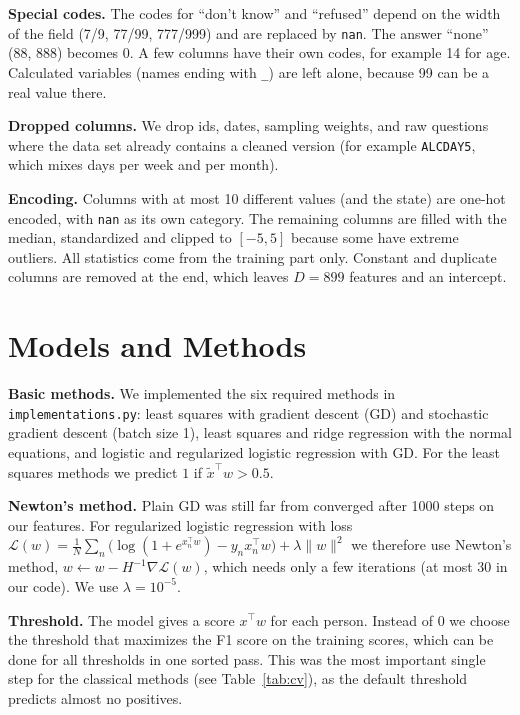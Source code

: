 \documentclass[10pt,conference,compsocconf]{IEEEtran}
\begin{document}
\textbf{Special codes.} The codes for ``don't know'' and ``refused'' depend on the width of the field (7/9, 77/99, 777/999) and are replaced by \texttt{nan}. The answer ``none'' (88, 888) becomes 0. A few columns have their own codes, for example 14 for age. Calculated variables (names ending with \texttt{\_}) are left alone, because 99 can be a real value there.

\textbf{Dropped columns.} We drop ids, dates, sampling weights, and raw questions where the data set already contains a cleaned version (for example \texttt{ALCDAY5}, which mixes days per week and per month).

\textbf{Encoding.} Columns with at most 10 different values (and the state) are one-hot encoded, with \texttt{nan} as its own category. The remaining columns are filled with the median, standardized and clipped to $[-5, 5]$ because some have extreme outliers. All statistics come from the training part only. Constant and duplicate columns are removed at the end, which leaves $D = 899$ features and an intercept.

\section{Models and Methods}
\label{sec:methods}

\textbf{Basic methods.} We implemented the six required methods in \texttt{implementations.py}: least squares with gradient descent (GD) and stochastic gradient descent (batch size 1), least squares and ridge regression with the normal equations, and logistic and regularized logistic regression with GD. For the least squares methods we predict $1$ if $\tilde{x}^\top w > 0.5$.

\textbf{Newton's method.} Plain GD was still far from converged after 1000 steps on our features. For regularized logistic regression with loss $\mathcal{L}(w) = \frac{1}{N}\sum_n \big(\log(1 + e^{x_n^\top w}) - y_n x_n^\top w\big) + \lambda \|w\|^2$ we therefore use Newton's method, $w \leftarrow w - H^{-1} \nabla \mathcal{L}(w)$, which needs only a few iterations (at most 30 in our code). We use $\lambda = 10^{-5}$.

\textbf{Threshold.} The model gives a score $x^\top w$ for each person. Instead of $0$ we choose the threshold that maximizes the F1 score on the training scores, which can be done for all thresholds in one sorted pass. This was the most important single step for the classical methods (see Table~\ref{tab:cv}), as the default threshold predicts almost no positives.
\end{document}
